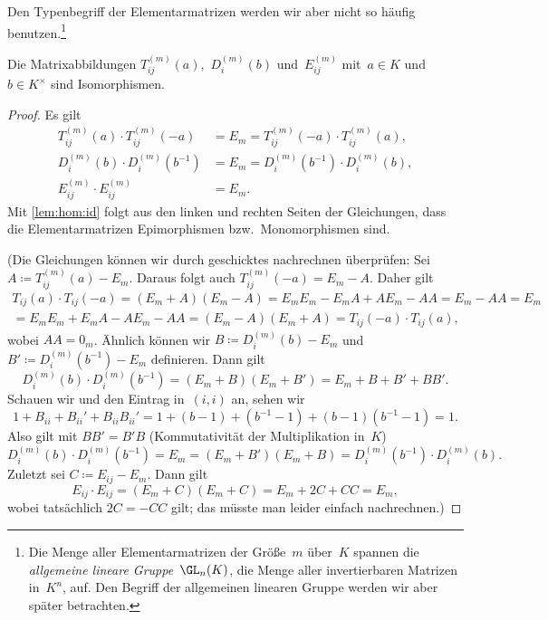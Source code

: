 \documentclass[a4paper]{article}
\begin{document}
Den Typenbegriff der Elementarmatrizen werden wir aber nicht so häufig benutzen.\footnote{Die Menge aller Elementarmatrizen der Größe~$m$ über~$K$ spannen die \emph{allgemeine lineare Gruppe~$\GL_n(K)$}, die Menge aller invertierbaren Matrizen in~$K^n$, auf. Den Begriff der allgemeinen linearen Gruppe werden wir aber später betrachten.}

\begin{lemma}\label{lem:elementary:iso}
    Die Matrixabbildungen $T_{ij}^{(m)}(a)$,~$D_i^{(m)}(b)$ und~$E_{ij}^{(m)}$ mit~$a \in K$ und~$b \in K^\times$ sind Isomorphismen.
\end{lemma}

\begin{proof}
    Es gilt
    \begin{align*}
        T_{ij}^{(m)}(a) \cdot T_{ij}^{(m)}(-a) & = E_m = T_{ij}^{(m)}(-a) \cdot T_{ij}^{(m)}(a), \\
        D_i^{(m)}(b) \cdot D_i^{(m)}(b^{-1})   & = E_m = D_i^{(m)}(b^{-1}) \cdot D_i^{(m)}(b),   \\
        E_{ij}^{(m)} \cdot E_{ij}^{(m)}        & = E_m.
    \end{align*}
    Mit \cref{lem:hom:id} folgt aus den linken und rechten Seiten der Gleichungen, dass die Elementarmatrizen Epimorphismen bzw.\ Monomorphismen sind.

    (Die Gleichungen können wir durch geschicktes nachrechnen überprüfen: Sei $A \coloneqq T_{ij}^{(m)}(a) - E_m$. Daraus folgt auch $T_{ij}^{(m)}(-a) = E_m-A$. Daher gilt
    \begin{multline*}
        T_{ij}(a) \cdot T_{ij}(-a) = (E_m+A) (E_m-A) = E_mE_m - E_mA + AE_m - AA = E_m - AA = E_m \\
        = E_mE_m + E_mA - AE_m - AA = (E_m-A) (E_m+A) = T_{ij}(-a) \cdot T_{ij}(a),
    \end{multline*}
    wobei $AA = 0_m$. Ähnlich können wir $B \coloneqq D_i^{(m)}(b) - E_m$ und $B' \coloneqq D_i^{(m)}(b^{-1}) - E_m$ definieren. Dann gilt
    \begin{equation*}
        D_i^{(m)}(b) \cdot D_i^{(m)}(b^{-1}) = (E_m+B) (E_m+B') = E_m + B + B' + BB'.
    \end{equation*}
    Schauen wir und den Eintrag in~$(i,i)$ an, sehen wir
    \begin{equation*}
        1 + B_{ii} + B_{ii}' + B_{ii}B_{ii}' = 1 + (b-1) + (b^{-1}-1) + (b-1)(b^{-1}-1) = 1.
    \end{equation*}
    Also gilt mit $BB' = B'B$ (Kommutativität der Multiplikation in~$K$)
    \begin{equation*}
        D_i^{(m)}(b) \cdot D_i^{(m)}(b^{-1}) = E_m = (E_m+B') (E_m+B) = D_i^{(m)}(b^{-1}) \cdot D_i^{(m)}(b).
    \end{equation*}
    Zuletzt sei $C \coloneqq E_{ij}-E_m$. Dann gilt
    \begin{equation*}
        E_{ij} \cdot E_{ij} = (E_m+C) (E_m+C) = E_m + 2C + CC = E_m,
    \end{equation*}
    wobei tatsächlich $2C = -CC$ gilt; das müsste man leider einfach nachrechnen.)
\end{proof}
\end{document}
